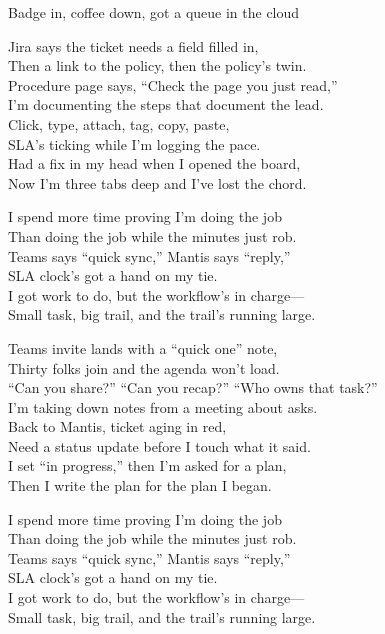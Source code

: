 \begin{lyrics}
Badge in, coffee down, got a queue in the cloud

Jira says the ticket needs a field filled in,\\
Then a link to the policy, then the policy’s twin.\\
Procedure page says, “Check the page you just read,”\\
I’m documenting the steps that document the lead.\\
Click, type, attach, tag, copy, paste,\\
SLA’s ticking while I’m logging the pace.\\
Had a fix in my head when I opened the board,\\
Now I’m three tabs deep and I’ve lost the chord.

I spend more time proving I’m doing the job\\
Than doing the job while the minutes just rob.\\
Teams says “quick sync,” Mantis says “reply,”\\
SLA clock’s got a hand on my tie.\\
I got work to do, but the workflow’s in charge—\\
Small task, big trail, and the trail’s running large.

Teams invite lands with a “quick one” note,\\
Thirty folks join and the agenda won’t load.\\
“Can you share?” “Can you recap?” “Who owns that task?”\\
I’m taking down notes from a meeting about asks.\\
Back to Mantis, ticket aging in red,\\
Need a status update before I touch what it said.\\
I set “in progress,” then I’m asked for a plan,\\
Then I write the plan for the plan I began.

I spend more time proving I’m doing the job\\
Than doing the job while the minutes just rob.\\
Teams says “quick sync,” Mantis says “reply,”\\
SLA clock’s got a hand on my tie.\\
I got work to do, but the workflow’s in charge—\\
Small task, big trail, and the trail’s running large.


\end{lyrics}
